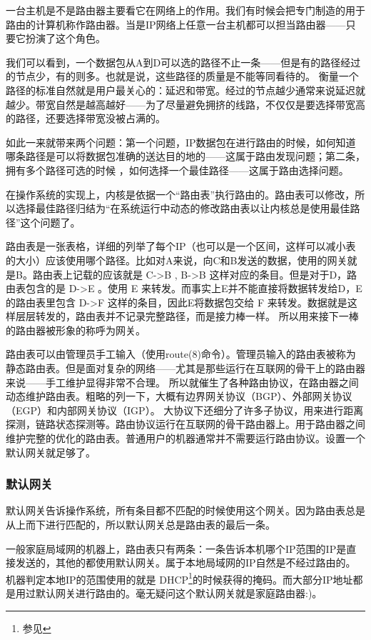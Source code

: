 一台主机是不是路由器主要看它在网络上的作用。我们有时候会把专门制造的用于路由的计算机称作路由器。当是IP网络上任意一台主机都可以担当路由器——只要它扮演了这个角色。

我们可以看到，一个数据包从A到D可以选的路径不止一条——但是有的路径经过的节点少，有的则多。也就是说，这些路径的质量是不能等同看待的。
衡量一个路径的标准自然就是用户最关心的：延迟和带宽。经过的节点越少通常来说延迟就越少。带宽自然是越高越好——为了尽量避免拥挤的线路，不仅仅是要选择带宽高的路径，还要选择带宽没被占满的。

如此一来就带来两个问题：第一个问题，IP数据包在进行路由的时候，如何知道哪条路径是可以将数据包准确的送达目的地的——这属于路由发现问题；第二条，拥有多个路径可选的时候 ，如何选择一个最佳路径——这属于路由选择问题。

在操作系统的实现上，内核是依据一个“路由表”执行路由的。路由表可以修改，所以选择最佳路径归结为“在系统运行中动态的修改路由表以让内核总是使用最佳路径”这个问题了。

路由表是一张表格，详细的列举了每个IP（也可以是一个区间，这样可以减小表的大小）应该使用哪个路径。比如对A来说，向C和B发送的数据，使用的网关就是B。路由表上记载的应该就是 C->B , B->B 这样对应的条目。但是对于D，路由表包含的是 D->E 。使用 E 来转发。而事实上E并不能直接将数据转发给D，E 的路由表里包含 D->F 这样的条目，因此E将数据包交给 F 来转发。数据就是这样层层转发的，路由表并不记录完整路径，而是接力棒一样。
所以用来接下一棒的路由器被形象的称呼为网关。

路由表可以由管理员手工输入（使用route(8)命令）。管理员输入的路由表被称为静态路由表。但是面对复杂的网络——尤其是那些运行在互联网的骨干上的路由器来说——手工维护显得非常不合理。
所以就催生了各种路由协议，在路由器之间动态维护路由表。粗略的列一下，大概有边界网关协议（BGP）、外部网关协议（EGP）和内部网关协议（IGP）。
大协议下还细分了许多子协议，用来进行距离探测，链路状态探测等。路由协议运行在互联网的骨干路由器上。用于路由器之间维护完整的优化的路由表。普通用户的机器通常并不需要运行路由协议。设置一个默认网关就足够了。

\begin{insertnote}
\subsubsection{默认网关}

默认网关告诉操作系统，所有条目都不匹配的时候使用这个网关。因为路由表总是从上而下进行匹配的，所以默认网关总是路由表的最后一条。

一般家庭局域网的机器上，路由表只有两条：一条告诉本机哪个IP范围的IP是直接发送的，其他的都使用默认网关。属于本地局域网的IP自然是不经过路由的。机器判定本地IP的范围使用的就是
DHCP\footnote{参见}的时候获得的掩码。而大部分IP地址都是用过默认网关进行路由的。毫无疑问这个默认网关就是家庭路由器:)。

\end{insertnote}

